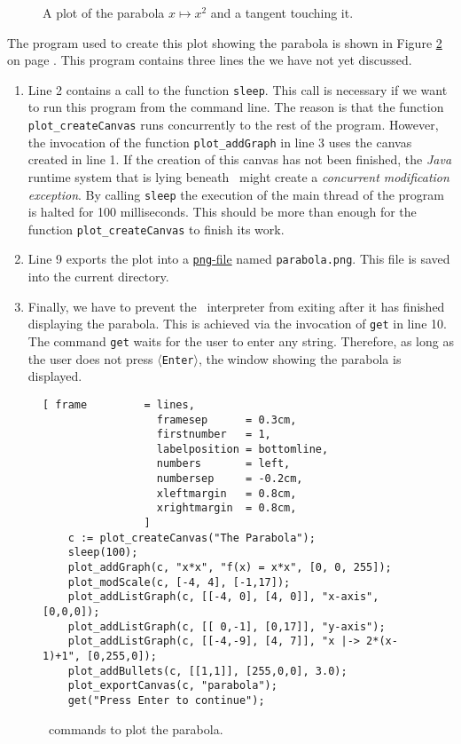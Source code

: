 \begin{figure}[!ht]
  \centering
  \caption{A plot of the parabola $x \mapsto x^2$ and a tangent touching it.}
  \label{fig:parabola3.eps}
\end{figure}


The program used to create this plot showing the parabola is shown in Figure \ref{fig:parabola.stlx}
on page \pageref{fig:parabola.stlx}.  This program contains three lines the we have not yet
discussed.
\begin{enumerate}
\item Line 2 contains a call to the function \texttt{sleep}.  This call is necessary if we want to
      run this program from the command line.  The reason is that the function
      \texttt{plot\_createCanvas} runs concurrently to the rest of the program.  However, the invocation
      of the function \texttt{plot\_addGraph} in line 3 uses the canvas created in line 1.  If the
      creation of this canvas has not been finished, the \textsl{Java} runtime system that is lying
      beneath \setlx\ might create a \emph{concurrent modification exception}.  By calling
      \texttt{sleep} the execution of the main thread of the program is halted for 100 milliseconds.
      This should be more than enough for the function \texttt{plot\_createCanvas} to finish its
      work. 
\item Line 9 exports the plot into a
      \href{https://en.wikipedia.org/wiki/Portable_Network_Graphics}{\texttt{png}-file} named
      \texttt{parabola.png}.  This file is saved into the current directory.
\item Finally, we have to prevent the \setlx\ interpreter from exiting after it has finished
      displaying the parabola.  This is achieved via the invocation of \texttt{get} in line 10.
      The command \texttt{get} waits for the user to enter any string.  Therefore, as long as the
      user does not press \texttt{$\langle$Enter$\rangle$}, the window showing the parabola is
      displayed. 
\end{enumerate}

\begin{figure}[!ht]
\centering
\begin{Verbatim}[ frame         = lines, 
                  framesep      = 0.3cm, 
                  firstnumber   = 1,
                  labelposition = bottomline,
                  numbers       = left,
                  numbersep     = -0.2cm,
                  xleftmargin   = 0.8cm,
                  xrightmargin  = 0.8cm,
                ]
    c := plot_createCanvas("The Parabola");
    sleep(100);
    plot_addGraph(c, "x*x", "f(x) = x*x", [0, 0, 255]);
    plot_modScale(c, [-4, 4], [-1,17]);
    plot_addListGraph(c, [[-4, 0], [4, 0]], "x-axis", [0,0,0]);
    plot_addListGraph(c, [[ 0,-1], [0,17]], "y-axis");
    plot_addListGraph(c, [[-4,-9], [4, 7]], "x |-> 2*(x-1)+1", [0,255,0]);
    plot_addBullets(c, [[1,1]], [255,0,0], 3.0);
    plot_exportCanvas(c, "parabola");
    get("Press Enter to continue");
\end{Verbatim}
\vspace*{-0.3cm}
\caption{\setlx\ commands to plot the parabola.}
\label{fig:parabola.stlx}
\end{figure}

